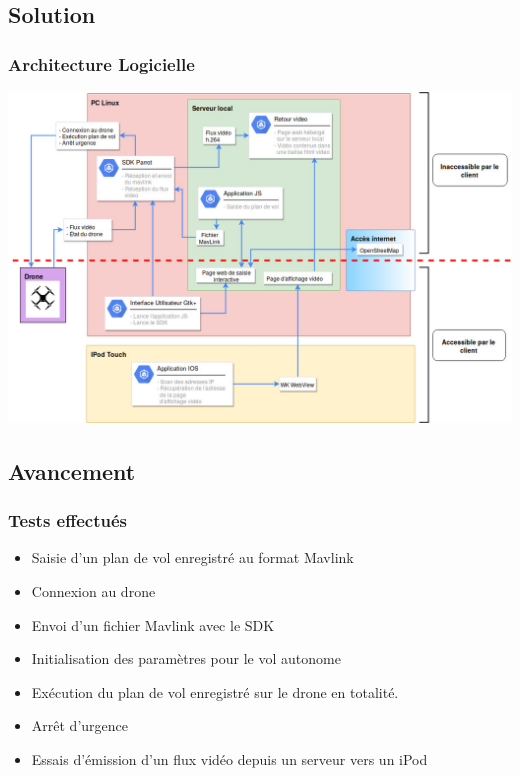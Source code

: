 \documentclass{beamer}
\begin{document}

	\begin{frame}
		\section{Solution}
		\begin{center}
		\frametitle{Architecture Logicielle}
       
        \includegraphics[scale=0.3]{Architecture_logicielle_v2.jpg}
		\end{center}
	\end{frame}
	
	
	
	\begin{frame}
		\section{Avancement}
		\begin{center}
		\frametitle{Tests effectués}
           	\begin{itemize}
           	    \item Saisie d'un plan de vol enregistré au format Mavlink
                \item Connexion au drone
                \item Envoi d'un fichier Mavlink avec le SDK
                \item Initialisation des paramètres pour le vol autonome
                \item Exécution du plan de vol enregistré sur le drone en totalité.
                 \item Arrêt d'urgence
                \item Essais d'émission d'un flux vidéo depuis un serveur vers un iPod
            \end{itemize}
		\end{center}
	\end{frame}
\end{document}
